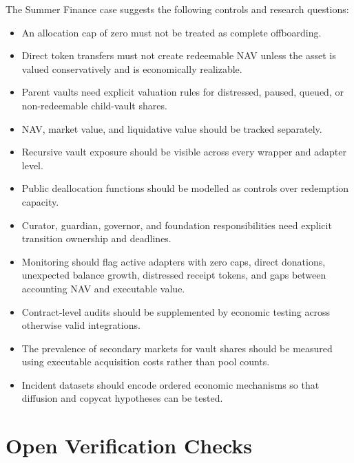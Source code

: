 \documentclass[11pt]{article}
\begin{document}
The Summer Finance case suggests the following controls and research questions:
\begin{itemize}
    \item An allocation cap of zero must not be treated as complete offboarding.
    \item Direct token transfers must not create redeemable NAV unless the asset is valued conservatively and is economically realizable.
    \item Parent vaults need explicit valuation rules for distressed, paused, queued, or non-redeemable child-vault shares.
    \item NAV, market value, and liquidative value should be tracked separately.
    \item Recursive vault exposure should be visible across every wrapper and adapter level.
    \item Public deallocation functions should be modelled as controls over redemption capacity.
    \item Curator, guardian, governor, and foundation responsibilities need explicit transition ownership and deadlines.
    \item Monitoring should flag active adapters with zero caps, direct donations, unexpected balance growth, distressed receipt tokens, and gaps between accounting NAV and executable value.
    \item Contract-level audits should be supplemented by economic testing across otherwise valid integrations.
    \item The prevalence of secondary markets for vault shares should be measured using executable acquisition costs rather than pool counts.
    \item Incident datasets should encode ordered economic mechanisms so that diffusion and copycat hypotheses can be tested.
\end{itemize}

\section{Open Verification Checks}
\end{document}

